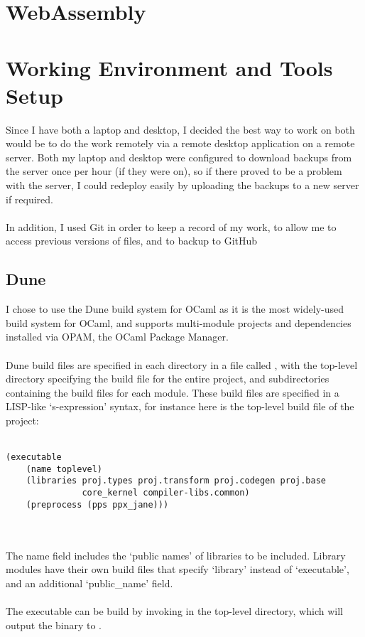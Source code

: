 \section{WebAssembly}

\section{Working Environment and Tools Setup}
Since I have both a laptop and desktop, I decided the best way to work on both would be to do the work remotely via a remote desktop application on a remote server. Both my laptop and desktop were configured to download backups from the server once per hour (if they were on), so if there proved to be a problem with the server, I could redeploy easily by uploading the backups to a new server if required.
\\\\
In addition, I used Git in order to keep a record of my work, to allow me to access previous versions of files, and to backup to GitHub

\subsection{Dune}
I chose to use the Dune\cite{Dune} build system for OCaml as it is the most widely-used build system for OCaml, and supports multi-module projects and dependencies installed via OPAM, the OCaml Package Manager.
\\\\
Dune build files are specified in each directory in a file called , with the top-level directory specifying the build file for the entire project, and subdirectories containing the build files for each module. These build files are specified in a LISP-like `s-expression' syntax, for instance here is the top-level build file of the project:
\\\\
\begin{minipage}{\linewidth}

\begin{verbatim}
(executable
    (name toplevel)
    (libraries proj.types proj.transform proj.codegen proj.base
               core_kernel compiler-libs.common)
    (preprocess (pps ppx_jane)))
\end{verbatim}
\end{minipage}
\\\\
The name field includes the `public names' of libraries to be included. Library modules have their own build files that specify `library' instead of `executable', and an additional `public\_name' field.
\\\\
The executable can be build by invoking  in the top-level directory, which will output the binary to .

